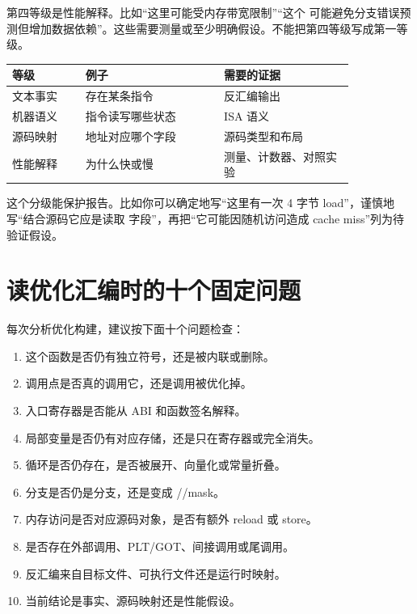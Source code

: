 第四等级是性能解释。比如“这里可能受内存带宽限制”“这个  可能避免分支错误预测但增加数据依赖”。这些需要测量或至少明确假设。不能把第四等级写成第一等级。

\begin{center}
\begin{tabular}{p{0.18\linewidth}p{0.34\linewidth}p{0.32\linewidth}}
\toprule
等级 & 例子 & 需要的证据 \\
\midrule
文本事实 & 存在某条指令 & 反汇编输出 \\
机器语义 & 指令读写哪些状态 & ISA 语义 \\
源码映射 & 地址对应哪个字段 & 源码类型和布局 \\
性能解释 & 为什么快或慢 & 测量、计数器、对照实验 \\
\bottomrule
\end{tabular}
\end{center}

这个分级能保护报告。比如你可以确定地写“这里有一次 4 字节 load”，谨慎地写“结合源码它应是读取  字段”，再把“它可能因随机访问造成 cache miss”列为待验证假设。

\section{读优化汇编时的十个固定问题}

每次分析优化构建，建议按下面十个问题检查：

\begin{enumerate}
  \item 这个函数是否仍有独立符号，还是被内联或删除。
  \item 调用点是否真的调用它，还是调用被优化掉。
  \item 入口寄存器是否能从 ABI 和函数签名解释。
  \item 局部变量是否仍有对应存储，还是只在寄存器或完全消失。
  \item 循环是否仍存在，是否被展开、向量化或常量折叠。
  \item 分支是否仍是分支，还是变成 //mask。
  \item 内存访问是否对应源码对象，是否有额外 reload 或 store。
  \item 是否存在外部调用、PLT/GOT、间接调用或尾调用。
  \item 反汇编来自目标文件、可执行文件还是运行时映射。
  \item 当前结论是事实、源码映射还是性能假设。
\end{enumerate}

